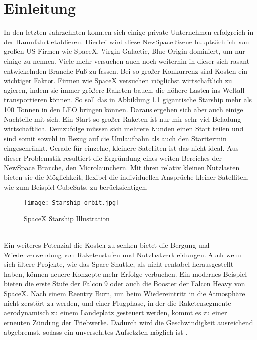 \chapter{Einleitung}

In den letzten Jahrzehnten konnten sich einige private Unternehmen erfolgreich in der Raumfahrt etablieren. Hierbei wird diese NewSpace Szene hauptsächlich von großen US-Firmen wie SpaceX, Virgin Galactic, Blue Origin dominiert, um nur einige zu nennen. Viele mehr versuchen auch noch weiterhin in dieser sich rasant entwickelnden Branche Fuß zu fassen. Bei so großer Konkurrenz sind Kosten ein wichtiger Faktor. Firmen wie SpaceX versuchen möglichst wirtschaftlich zu agieren, indem sie immer größere Raketen bauen, die höhere Lasten ins Weltall transportieren können. So soll das in Abbildung \ref{abb_BFR} gigantische Starship mehr als 100 Tonnen in den \gls{LEO} \cite{starShipUserGuide} bringen können. Daraus ergeben sich aber auch einige Nachteile mit sich. Ein Start so großer Raketen ist nur mir sehr viel Beladung wirtschaftlich. Demzufolge müssen sich mehrere Kunden einen Start teilen und sind somit sowohl in Bezug auf die Umlaufbahn als auch den Starttermin eingeschränkt. Gerade für einzelne, kleinere Satelliten ist das nicht ideal. Aus dieser Problematik resultiert die Ergründung eines weiten Bereiches der NewSpace Branche, den Microlaunchern. Mit ihren relativ kleinen Nutzlasten bieten sie die Möglichkeit, flexibel die individuellen Ansprüche kleiner Satelliten, wie zum Beispiel CubeSats, zu berücksichtigen.
\begin{figure}[h]
	\centering
	\texttt{[image: Starship\_orbit.jpg]}
	\begin{flushright}
	\end{flushright}
	\caption{SpaceX Starship Illustration}
	\label{abb_BFR}
\end{figure}\\
Ein weiteres Potenzial die Kosten zu senken bietet die Bergung und Wiederverwendung von Raketenstufen und Nutzlastverkleidungen. Auch wenn sich ältere Projekte, wie das Space Shuttle, als nicht rentabel herausgestellt haben, können neuere Konzepte mehr Erfolge verbuchen. Ein modernes Beispiel bieten die erste Stufe der Falcon 9 oder auch die Booster der Falcon Heavy von SpaceX. Nach einem Reentry Burn, um beim Wiedereintritt in die Atmosphäre nicht zerstört zu werden, und einer Flugphase, in der die Raketensegmente aerodynamisch zu einem Landeplatz gesteuert werden, kommt es zu einer erneuten Zündung der Triebwerke. Dadurch wird die Geschwindigkeit ausreichend abgebremst, sodass ein unversehrtes Aufsetzten möglich ist \cite{falconUserGuide}.
